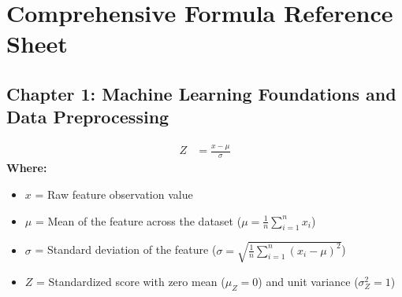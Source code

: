 \newpage
\thispagestyle{plain}
\chapter*{Comprehensive Formula Reference Sheet}
{}

\vspace*{0.5cm}

\section*{Chapter 1: Machine Learning Foundations and Data Preprocessing}

\begin{formulabox}
\begin{align*}
    Z &= \frac{x - \mu}{\sigma}
\end{align*}
\textbf{Where:}
\begin{itemize}[noitemsep, topsep=1pt]
    \item $x$ = Raw feature observation value
    \item $\mu$ = Mean of the feature across the dataset ($\mu = \frac{1}{n} \sum_{i=1}^n x_i$)
    \item $\sigma$ = Standard deviation of the feature ($\sigma = \sqrt{\frac{1}{n} \sum_{i=1}^n (x_i - \mu)^2}$)
    \item $Z$ = Standardized score with zero mean ($\mu_Z = 0$) and unit variance ($\sigma_Z^2 = 1$)
\end{itemize}
\end{formulabox}

